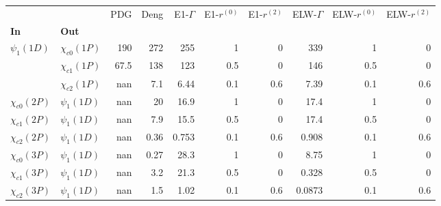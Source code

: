 \begin{tabular}{l|l|r|r|r|r|r|r|r|r}
\toprule
                &                &  PDG &  Deng &  E1-$\Gamma$ &  E1-$r^{(0)}$ &  E1-$r^{(2)}$ &  ELW-$\Gamma$ &  ELW-$r^{(0)}$ &  ELW-$r^{(2)}$ \\
\textbf{In} & \textbf{Out} &      &       &              &               &               &               &                &                \\
\midrule
\textbf{$\psi_{1}(1D)$} & \textbf{$\chi_{c0}(1P)$} &  190 &   272 &          255 &             1 &             0 &           339 &              1 &              0 \\
                & \textbf{$\chi_{c1}(1P)$} & 67.5 &   138 &          123 &           0.5 &             0 &           146 &            0.5 &              0 \\
                & \textbf{$\chi_{c2}(1P)$} &  nan &   7.1 &         6.44 &           0.1 &           0.6 &          7.39 &            0.1 &            0.6 \\
\textbf{$\chi_{c0}(2P)$} & \textbf{$\psi_{1}(1D)$} &  nan &    20 &         16.9 &             1 &             0 &          17.4 &              1 &              0 \\
\textbf{$\chi_{c1}(2P)$} & \textbf{$\psi_{1}(1D)$} &  nan &   7.9 &         15.5 &           0.5 &             0 &          17.4 &            0.5 &              0 \\
\textbf{$\chi_{c2}(2P)$} & \textbf{$\psi_{1}(1D)$} &  nan &  0.36 &        0.753 &           0.1 &           0.6 &         0.908 &            0.1 &            0.6 \\
\textbf{$\chi_{c0}(3P)$} & \textbf{$\psi_{1}(1D)$} &  nan &  0.27 &         28.3 &             1 &             0 &          8.75 &              1 &              0 \\
\textbf{$\chi_{c1}(3P)$} & \textbf{$\psi_{1}(1D)$} &  nan &   3.2 &         21.3 &           0.5 &             0 &         0.328 &            0.5 &              0 \\
\textbf{$\chi_{c2}(3P)$} & \textbf{$\psi_{1}(1D)$} &  nan &   1.5 &         1.02 &           0.1 &           0.6 &        0.0873 &            0.1 &            0.6 \\
\bottomrule
\end{tabular}
